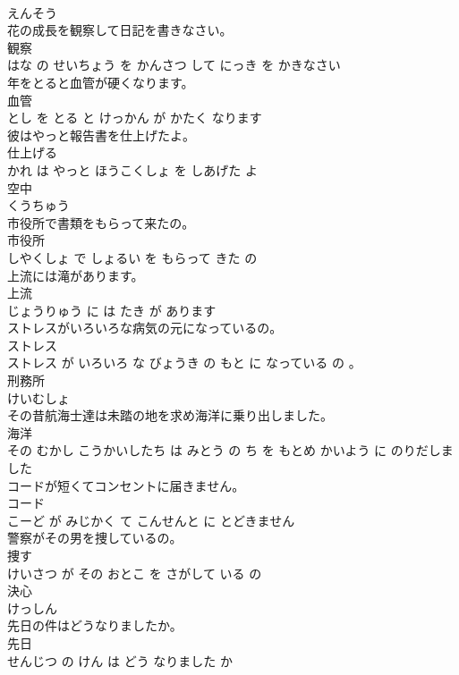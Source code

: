 \documentclass[8pt]{extreport}
\begin{document}
\begin{CJK}{UTF8}{min}
\\	えんそう			
\\	花の成長を観察して日記を書きなさい。	
\\	観察 
\\	はな の せいちょう を かんさつ して にっき を かきなさい			
\\	年をとると血管が硬くなります。	
\\	血管 
\\	とし を とる と けっかん が かたく なります			
\\	彼はやっと報告書を仕上げたよ。	
\\	仕上げる 
\\	かれ は やっと ほうこくしょ を しあげた よ			
\\	空中	
\\	くうちゅう			
\\	市役所で書類をもらって来たの。	
\\	市役所 
\\	しやくしょ で しょるい を もらって きた の			
\\	上流には滝があります。	
\\	上流 
\\	じょうりゅう に は たき が あります			
\\	ストレスがいろいろな病気の元になっているの。	
\\	ストレス 
\\	ストレス が いろいろ な びょうき の もと に なっている の 。			
\\	刑務所	
\\	けいむしょ			
\\	その昔航海士達は未踏の地を求め海洋に乗り出しました。	
\\	海洋 
\\	その むかし こうかいしたち は みとう の ち を もとめ かいよう に のりだしました			
\\	コードが短くてコンセントに届きません。	
\\	コード 
\\	こーど が みじかく て こんせんと に とどきません			
\\	警察がその男を捜しているの。	
\\	捜す 
\\	けいさつ が その おとこ を さがして いる の			
\\	決心	
\\	けっしん			
\\	先日の件はどうなりましたか。	
\\	先日 
\\	せんじつ の けん は どう なりました か			

\end{CJK}
\end{document}
